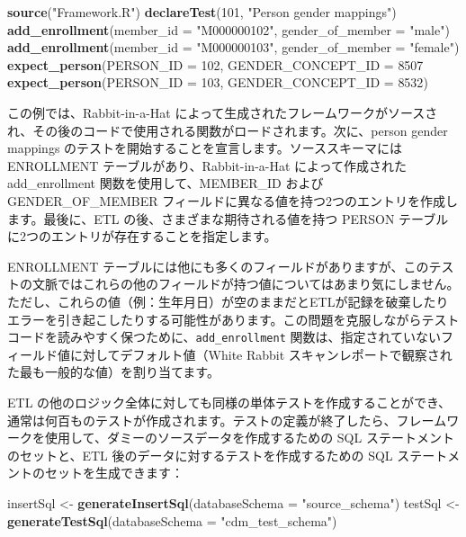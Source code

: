 \documentclass[
  11pt]{book}
\newenvironment{Shaded}{\begin{snugshade}}{\end{snugshade}}
\newcommand{\AttributeTok}[1]{\textcolor[rgb]{0.13,0.29,0.53}{#1}}
\newcommand{\DecValTok}[1]{\textcolor[rgb]{0.00,0.00,0.81}{#1}}
\newcommand{\FunctionTok}[1]{\textcolor[rgb]{0.13,0.29,0.53}{\textbf{#1}}}
\newcommand{\NormalTok}[1]{#1}
\newcommand{\OtherTok}[1]{\textcolor[rgb]{0.56,0.35,0.01}{#1}}
\newcommand{\StringTok}[1]{\textcolor[rgb]{0.31,0.60,0.02}{#1}}
\theoremstyle{definition}
\theoremstyle{definition}
\theoremstyle{definition}
\theoremstyle{definition}
\theoremstyle{remark}
\begin{document}
\begin{Shaded}
\begin{Highlighting}[]
\FunctionTok{source}\NormalTok{(}\StringTok{"Framework.R"}\NormalTok{)}
\FunctionTok{declareTest}\NormalTok{(}\DecValTok{101}\NormalTok{, }\StringTok{"Person gender mappings"}\NormalTok{)}
\FunctionTok{add\_enrollment}\NormalTok{(}\AttributeTok{member\_id =} \StringTok{"M000000102"}\NormalTok{, }\AttributeTok{gender\_of\_member =} \StringTok{"male"}\NormalTok{)}
\FunctionTok{add\_enrollment}\NormalTok{(}\AttributeTok{member\_id =} \StringTok{"M000000103"}\NormalTok{, }\AttributeTok{gender\_of\_member =} \StringTok{"female"}\NormalTok{)}
\FunctionTok{expect\_person}\NormalTok{(}\AttributeTok{PERSON\_ID =} \DecValTok{102}\NormalTok{, }\AttributeTok{GENDER\_CONCEPT\_ID =} \DecValTok{8507}
\FunctionTok{expect\_person}\NormalTok{(}\AttributeTok{PERSON\_ID =} \DecValTok{103}\NormalTok{, }\AttributeTok{GENDER\_CONCEPT\_ID =} \DecValTok{8532}\NormalTok{)}
\end{Highlighting}
\end{Shaded}

この例では、Rabbit-in-a-Hat によって生成されたフレームワークがソースされ、その後のコードで使用される関数がロードされます。次に、person gender mappings のテストを開始することを宣言します。ソーススキーマには ENROLLMENT テーブルがあり、Rabbit-in-a-Hat によって作成された add\_enrollment 関数を使用して、MEMBER\_ID および GENDER\_OF\_MEMBER フィールドに異なる値を持つ2つのエントリを作成します。最後に、ETL の後、さまざまな期待される値を持つ PERSON テーブルに2つのエントリが存在することを指定します。

ENROLLMENT テーブルには他にも多くのフィールドがありますが、このテストの文脈ではこれらの他のフィールドが持つ値についてはあまり気にしません。ただし、これらの値（例：生年月日）が空のままだとETLが記録を破棄したりエラーを引き起こしたりする可能性があります。この問題を克服しながらテストコードを読みやすく保つために、\texttt{add\_enrollment} 関数は、指定されていないフィールド値に対してデフォルト値（White Rabbit スキャンレポートで観察された最も一般的な値）を割り当てます。

ETL の他のロジック全体に対しても同様の単体テストを作成することができ、通常は何百ものテストが作成されます。テストの定義が終了したら、フレームワークを使用して、ダミーのソースデータを作成するための SQL ステートメントのセットと、ETL 後のデータに対するテストを作成するための SQL ステートメントのセットを生成できます：

\begin{Shaded}
\begin{Highlighting}[]
\NormalTok{insertSql }\OtherTok{\textless{}{-}} \FunctionTok{generateInsertSql}\NormalTok{(}\AttributeTok{databaseSchema =} \StringTok{"source\_schema"}\NormalTok{)}
\NormalTok{testSql }\OtherTok{\textless{}{-}} \FunctionTok{generateTestSql}\NormalTok{(}\AttributeTok{databaseSchema =} \StringTok{"cdm\_test\_schema"}\NormalTok{)}
\end{Highlighting}
\end{Shaded}
\end{document}
